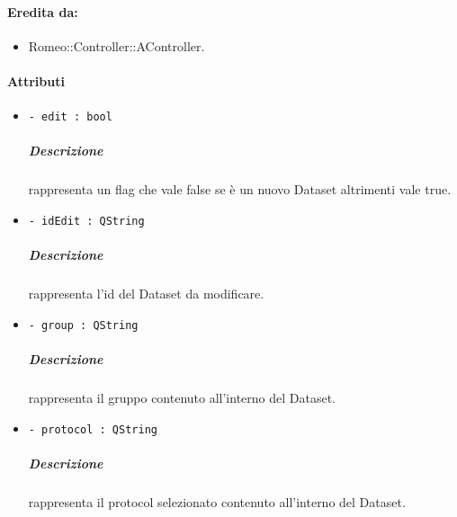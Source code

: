 	\paragraph{Eredita da:}
		\begin{itemize}
			\item Romeo::Controller::AController.
		\end{itemize}
	\paragraph{Attributi}
		\begin{itemize}
			\item \color{teal} \verb!- edit : bool!
			\color{black}
			\subparagraph{Descrizione} rappresenta un flag che vale false se è un nuovo Dataset\g{} altrimenti vale true.
			\item \color{teal} \verb!- idEdit : QString!
			\color{black}
			\subparagraph{Descrizione} rappresenta l'id del Dataset\g{} da modificare.
			\item \color{teal} \verb!- group : QString!
			\color{black}
			\subparagraph{Descrizione} rappresenta il gruppo contenuto all'interno del Dataset\g{}.
			\item \color{teal} \verb!- protocol : QString!
			\color{black}
			\subparagraph{Descrizione} rappresenta il protocol selezionato contenuto all'interno del Dataset\g{}.
		\end{itemize}
